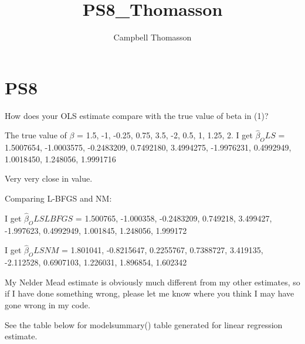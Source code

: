 \documentclass{article}
\title{PS8_Thomasson}
\author{Campbell Thomasson}
\begin{document}
\maketitle

\section{PS8}

How does your OLS estimate compare with the true value of beta in (1)?

The true value of \( {\beta} \) = 1.5, -1, -0.25, 0.75, 3.5, -2, 0.5, 1, 1.25, 2. 
I get \( \hat{\beta}_OLS \) =  1.5007654, -1.0003575, -0.2483209, 0.7492180, 3.4994275, -1.9976231, 0.4992949, 1.0018450, 1.248056, 1.9991716

Very very close in value.

Comparing L-BFGS and NM:

I get \( \hat{\beta}_OLSLBFGS \) =  1.500765, -1.000358, -0.2483209, 0.749218, 3.499427, -1.997623, 0.4992949, 1.001845, 1.248056, 1.999172

I get \( \hat{\beta}_OLSNM \) =  1.801041, -0.8215647, 0.2255767, 0.7388727, 3.419135, -2.112528, 0.6907103, 1.226031, 1.896854, 1.602342

My Nelder Mead estimate is obviously much different from my other estimates, so if I have done something wrong, please let me know where you think I may have gone wrong in my code.

See the table below for modelsummary() table generated for linear regression estimate.
\end{document}
